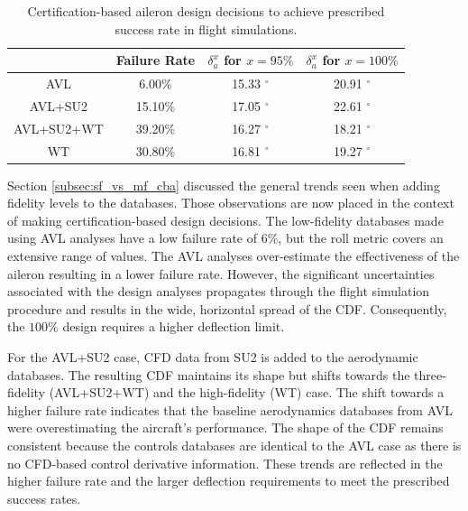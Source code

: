 \begin{table}
\centering
    \renewcommand{\arraystretch}{1.2}
    \captionsetup{justification=centering}
    \caption{Certification-based aileron design decisions to achieve prescribed success rate in flight simulations.} 
    \begin{tabular}{|c||c|c|c|}
    \hline
         & Failure Rate & $\delta^{x}_a$ for $x = 95\%$ & $\delta^{x}_a$ for $x = 100\%$ \\ \hline \hline
        AVL & 6.00\% & 15.33 $^\circ$ & 20.91 $^\circ$ \\ \hline 
        AVL+SU2 & 15.10\% & 17.05 $^\circ$ & 22.61 $^\circ$ \\ \hline 
        AVL+SU2+WT & 39.20\% & 16.27 $^\circ$ & 18.21 $^\circ$ \\ \hline 
        WT & 30.80\% & 16.81 $^\circ$ & 19.27 $^\circ$ \\ \hline 
    \end{tabular}
    \label{tab:reo_roll_design}
\end{table}


Section \ref{subsec:sf_vs_mf_cba} discussed the general trends seen when adding fidelity levels to the databases.
Those observations are now placed in the context of making certification-based design decisions.
The low-fidelity databases made using AVL analyses have a low failure rate of $6\%$, but the roll metric covers an extensive range of values.
The AVL analyses over-estimate the effectiveness of the aileron resulting in a lower failure rate. 
However, the significant uncertainties associated with the design analyses propagates through the flight simulation procedure and results in the wide, horizontal spread of the CDF.
Consequently, the $100\%$ design requires a higher deflection limit.

For the AVL+SU2 case, CFD data from SU2 is added to the aerodynamic databases. 
The resulting CDF maintains its shape but shifts towards the three-fidelity (AVL+SU2+WT) and the high-fidelity (WT) case. 
The shift towards a higher failure rate indicates that the baseline aerodynamics databases from AVL were overestimating the aircraft's performance. 
The shape of the CDF remains consistent because the controls databases are identical to the AVL case as there is no CFD-based control derivative information.
These trends are reflected in the higher failure rate and the larger deflection requirements to meet the prescribed success rates. 

